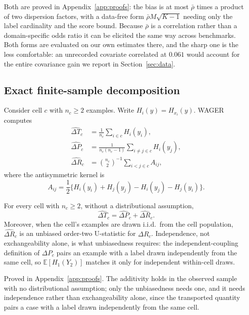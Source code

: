 \noindent
Both are proved in Appendix~\ref{app:proofs}: the bias is at most $\bar\rho$ times a product
of two dispersion factors, with a data-free form $\bar\rho M\sqrt{K-1}$ needing only the
label cardinality and the score bound. Because $\bar\rho$ is a correlation rather than a
domain-specific odds ratio it can be elicited the same way across benchmarks. Both forms are
evaluated on our own estimates there, and the sharp one is the less comfortable: an
unrecorded covariate correlated at $0.061$ would account for the entire covariance gain we
report in Section~\ref{sec:data}.

\subsection{Exact finite-sample decomposition}\label{sec:finite}

Consider cell $c$ with $n_c\ge2$ examples. Write $H_i(y)=H_{x_i}(y)$. WAGER computes
\begin{align}
\widehat{\Delta T}_c
 &=\frac1{n_c}\sum_{i\in c} H_i(y_i), \\
\widehat{\Delta P}_c
 &=\frac1{n_c(n_c-1)}\sum_{i\ne j\in c}H_i(y_j),
\label{eq:sample-prior}\\
\widehat{\Delta R}_c
 &=\binom{n_c}{2}^{-1}\sum_{i<j\in c} A_{ij},
\label{eq:sample-reason}
\end{align}
where the antisymmetric kernel is
\begin{equation}
A_{ij}=\frac12\{H_i(y_i)+H_j(y_j)-H_i(y_j)-H_j(y_i)\}.
\label{eq:kernel}
\end{equation}

\begin{theorem}\label{thm:sample}
For every cell with $n_c\ge2$, without a distributional assumption,
\begin{equation}
\widehat{\Delta T}_c=\widehat{\Delta P}_c+\widehat{\Delta R}_c.
\end{equation}
Moreover, when the cell's examples are drawn i.i.d.\ from the cell population,
$\widehat{\Delta R}_c$ is an unbiased order-two U-statistic for $\Delta R_c$.
Independence, not exchangeability alone, is what unbiasedness requires: the
independent-coupling definition of $\Delta P_c$ pairs an example with a label drawn
independently from the same cell, so $\mathbb E[H_1(Y_2)]$ matches it only for
independent within-cell draws.
\end{theorem}

\noindent
Proved in Appendix~\ref{app:proofs}. The additivity holds in the observed sample with no
distributional assumption; only the unbiasedness needs one, and it needs independence
rather than exchangeability alone, since the transported quantity pairs a case with a label
drawn independently from the same cell.

